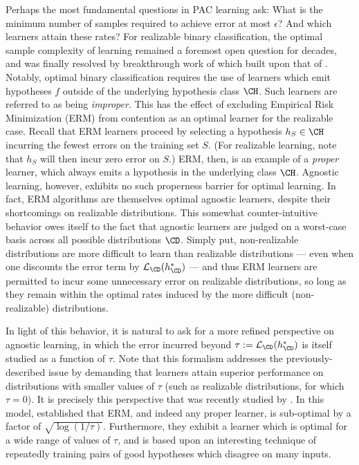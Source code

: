 Perhaps the most fundamental questions in PAC learning ask: What is the minimum number of samples required to achieve error at most $\epsilon$? And which learners attain these rates? For realizable binary classification, the optimal sample complexity of learning remained a foremost open question for decades, and was finally resolved by breakthrough work of \citet{hanneke2016optimal} which built upon that of \citet{simon2015almost}. Notably, optimal binary classification requires the use of learners which emit hypotheses $f$ outside of the underlying hypothesis class $\CH$. Such learners are referred to as being \emph{improper}. This has the effect of excluding Empirical Risk Minimization (ERM) from contention as an optimal learner for the realizable case. Recall that ERM learners proceed by selecting a hypothesis $h_S \in \CH$ incurring the fewest errors on the training set $S$. (For realizable learning, note that $h_S$ will then incur zero error on $S$.) ERM, then, is an example of a \emph{proper} learner, which always emits a hypothesis in the underlying class $\CH$. 
Agnostic learning, however, exhibits no such properness barrier for optimal learning. In fact, ERM algorithms are themselves optimal agnostic learners, despite their shortcomings on realizable distributions. This somewhat counter-intuitive behavior owes itself to the fact that agnostic learners are judged on a worst-case basis across all possible distributions $\CD$. Simply put, non-realizable distributions are more difficult to learn than realizable distributions --- even when one discounts the error term by $\ls_\CD(h^*_\CD)$ --- and thus ERM learners are permitted to incur some unnecessary error on realizable distributions, so long as they remain within the optimal rates induced by the more difficult (non-realizable) distributions. 

In light of this behavior, it is natural to ask for a more refined perspective on agnostic learning, in which the error incurred beyond $\tau := \ls_\CD(h^*_\CD)$ is itself studied as a function of $\tau$. Note that this formalism addresses the previously-described issue by demanding that learners attain superior performance on distributions with smaller values of $\tau$ (such as realizable distributions, for which $\tau = 0$). It is precisely this perspective that was recently 
studied by \citet{hanneke2024revisiting}. In this model, \citet{hanneke2024revisiting} established that ERM, and indeed any proper learner, is sub-optimal by a factor of $\sqrt{\log(1 / \tau)}$. Furthermore, they exhibit a learner which is optimal for a wide range of values of $\tau$, and is based upon an interesting technique of repeatedly training pairs of good hypotheses which disagree on many inputs. 

